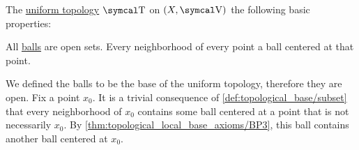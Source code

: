 \begin{Proposition}\label{thm:uniform_topology_properties}
  The \hyperref[def:uniform_topology]{uniform topology} \( \CT \) on \( (X, \CV) \) the following basic properties:
  \begin{DefEnum}
     All \hyperref[def:entourage/ball]{balls} are open sets.
     Every neighborhood of every point a ball centered at that point.
  \end{DefEnum}
\end{Proposition}
\begin{RefListProof}
     We defined the balls to be the base of the uniform topology, therefore they are open.
     Fix a point \( x_0 \). It is a trivial consequence of \cref{def:topological_base/subset} that every neighborhood of \( x_0 \) contains some ball centered at a point that is not necessarily \( x_0 \). By \cref{thm:topological_local_base_axioms/BP3}, this ball contains another ball centered at \( x_0 \).
\end{RefListProof}

